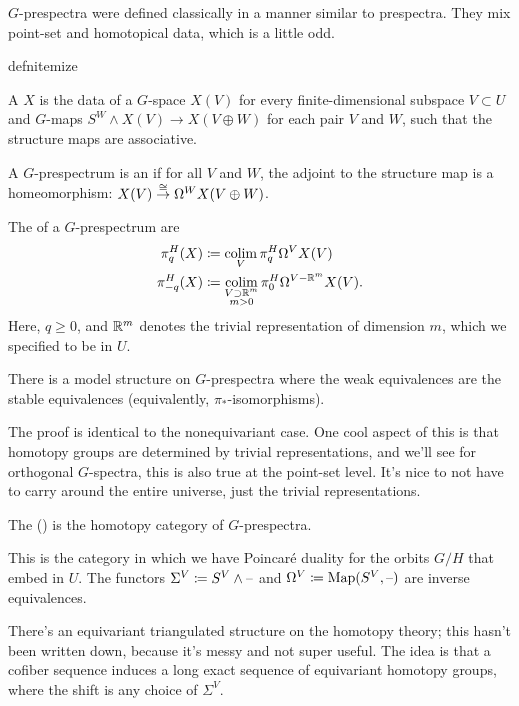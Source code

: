 $G$-prespectra were defined classically in a manner similar to prespectra. They mix point-set and homotopical data,
which is a little odd.
\begin{comp}{defn}{itemize}
	\item A  $X$ is the data of a $G$-space $X(V)$ for every finite-dimensional subspace
	$V\subset U$ and $G$-maps $S^W\wedge X(V)\to X(V\oplus W)$ for each pair $V$ and $W$, such that the structure
	maps are associative.
	\item A $G$-prespectrum is an  if for all $V$ and $W$, the adjoint to the structure
	map is a homeomorphism: $X(V)\stackrel\cong\to\Omega^W X(V\oplus W)$.
	\item The  of a $G$-prespectrum are
	\begin{align*}
		\pi_q^H(X) &\coloneqq \operatorname*{colim}_V \pi_q^H \Omega^V X(V)\\
		\pi_{-q}^H(X) &\coloneqq \operatorname*{colim}_{\substack{V\supset\mathbb R^m\\m > 0}} \pi_0^H\Omega^{V - \mathbb R^m}X(V).
	\end{align*}
	Here, $q\ge 0$, and $\mathbb R^m$ denotes the trivial representation of dimension $m$, which we specified to be in $U$.
\end{comp}
\begin{prop}
There is a model structure on $G$-prespectra where the weak equivalences are the stable equivalences (equivalently,
$\pi_*$-isomorphisms).
\end{prop}
The proof is identical to the nonequivariant case. One cool aspect of this is that homotopy groups are determined
by trivial representations, and we'll see for orthogonal $G$-spectra, this is also true at the point-set level.
It's nice to not have to carry around the entire universe, just the trivial representations.
\begin{defn}
The  () is the homotopy category of $G$-prespectra.
\end{defn}
This is the category in which we have Poincaré duality for the orbits $G/H$ that embed in $U$. The functors
$\Sigma^V\coloneqq S^V\wedge\text{--}$ and $\Omega^V\coloneqq\operatorname{Map}(S^V,\text{--})$ are inverse equivalences.

There's an equivariant triangulated structure on the homotopy theory; this hasn't been written down, because it's
messy and not super useful. The idea is that a cofiber sequence induces a long exact sequence of equivariant
homotopy groups, where the shift is any choice of $\Sigma^V$.
